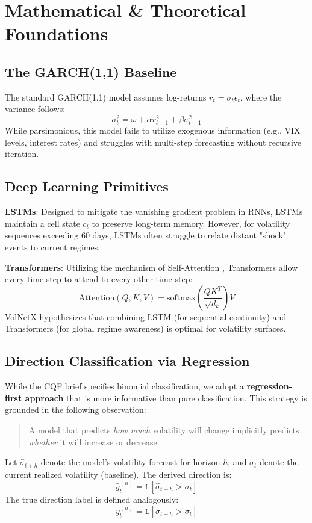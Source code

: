 \documentclass[11pt, a4paper]{article}
\begin{document}
\section{Mathematical \& Theoretical Foundations}
\subsection{The GARCH(1,1) Baseline}
The standard GARCH(1,1) model assumes log-returns $r_t = \sigma_t \epsilon_t$, where the variance follows:
\begin{equation}
    \sigma_t^2 = \omega + \alpha r_{t-1}^2 + \beta \sigma_{t-1}^2
\end{equation}
While parsimonious, this model fails to utilize exogenous information (e.g., VIX levels, interest rates) and struggles with multi-step forecasting without recursive iteration.

\subsection{Deep Learning Primitives}
\textbf{LSTMs}: Designed to mitigate the vanishing gradient problem in RNNs, LSTMs maintain a cell state $c_t$ to preserve long-term memory. However, for volatility sequences exceeding 60 days, LSTMs often struggle to relate distant "shock" events to current regimes.

\textbf{Transformers}: Utilizing the mechanism of Self-Attention \cite{vaswani2017}, Transformers allow every time step to attend to every other time step:
\begin{equation}
    \text{Attention}(Q, K, V) = \text{softmax}\left(\frac{QK^T}{\sqrt{d_k}}\right)V
\end{equation}
VolNetX hypothesizes that combining LSTM (for sequential continuity) and Transformers (for global regime awareness) is optimal for volatility surfaces.

\subsection{Direction Classification via Regression}
While the CQF brief specifies binomial classification, we adopt a 
\textbf{regression-first approach} that is more informative than pure 
classification. This strategy is grounded in the following observation:
\begin{quote}
    A model that predicts \textit{how much} volatility will change 
    implicitly predicts \textit{whether} it will increase or decrease.
\end{quote}
Let $\hat{\sigma}_{t+h}$ denote the model's volatility forecast for horizon $h$, 
and $\sigma_t$ denote the current realized volatility (baseline). 
The derived direction is:
\begin{equation}
    \hat{y}_t^{(h)} = \mathbb{1}\left[\hat{\sigma}_{t+h} > \sigma_t\right]
    \label{eq:direction}
\end{equation}
The true direction label is defined analogously:
\begin{equation}
    y_t^{(h)} = \mathbb{1}\left[\sigma_{t+h} > \sigma_t\right]
\end{equation}
\end{document}
